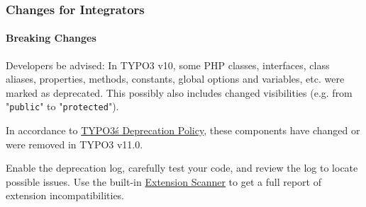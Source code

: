 %

\begin{frame}[fragile]
	\frametitle{Changes for Integrators}
	\framesubtitle{Breaking Changes}

	\small
		Developers be advised: In TYPO3 v10, some PHP classes, interfaces, class aliases,
		properties, methods, constants, global options and variables, etc. were marked
		as deprecated. This possibly also includes changed visibilities (e.g. from
		"\texttt{public}" to "\texttt{protected}").

		\vspace{0.2cm}

		In accordance to
		\href{https://typo3.org/article/typo3-deprecation-policy}{TYPO3\'s Deprecation Policy},
		these components have changed or were removed in TYPO3 v11.0.

		\vspace{0.2cm}

		Enable the deprecation log, carefully test your code, and review the log to
		locate possible issues. Use the built-in
		\href{https://docs.typo3.org/m/typo3/reference-coreapi/master/en-us/ApiOverview/ExtensionScanner/Index.html}{Extension Scanner}
		to get a full report of extension incompatibilities.

	\normalsize

\end{frame}

